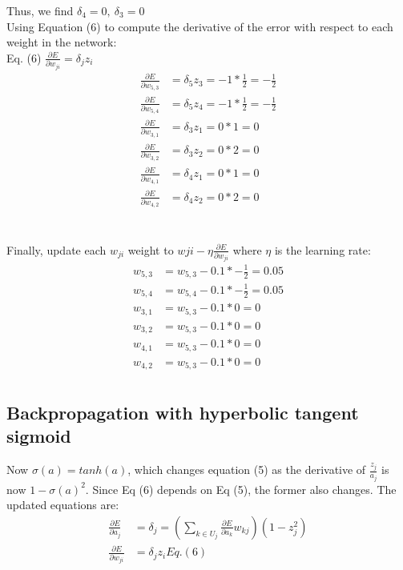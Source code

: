 \documentclass{article}
\begin{document}
Thus, we find $\delta_4 = 0,~\delta_3 = 0$
\\
Using Equation (6) to compute the derivative of the error with respect to each weight in the network: \\
Eq. (6) $\frac{\partial E}{\partial w_{ji}} = \delta_j z_i$
\begin{align*}
\frac{\partial E}{\partial w_{5,3}} &= \delta_5 z_3 = -1*\frac{1}{2} = -\frac{1}{2} \\
\frac{\partial E}{\partial w_{5,4}} &= \delta_5 z_4 = -1*\frac{1}{2} = -\frac{1}{2} \\
\frac{\partial E}{\partial w_{3,1}} &= \delta_3 z_1 = 0*1 = 0 \\
\frac{\partial E}{\partial w_{3,2}} &= \delta_3 z_2 = 0*2 = 0 \\
\frac{\partial E}{\partial w_{4,1}} &= \delta_4 z_1 = 0*1 = 0 \\
\frac{\partial E}{\partial w_{4,2}} &= \delta_4 z_2 = 0*2 = 0
\end{align*}
\\
\\
Finally, update each $w_{ji}$ weight to $w{ji} - \eta \frac{\partial E}{\partial w_{ji}}$ where $\eta$ is the learning rate:
\begin{align*}
 w_{5,3} &= w_{5,3} - 0.1*-\frac{1}{2} = 0.05\\
 w_{5,4} &= w_{5,4} - 0.1*-\frac{1}{2} = 0.05\\
 w_{3,1} &= w_{5,3} - 0.1*0 = 0\\
 w_{3,2} &= w_{5,3} - 0.1*0 = 0\\
 w_{4,1} &= w_{5,3} - 0.1*0 = 0\\
 w_{4,2} &= w_{5,3} - 0.1*0 = 0\\
\end{align*}


\subsection*{Backpropagation with hyperbolic tangent sigmoid}
Now $\sigma(a) = tanh(a)$, which changes equation (5) as the derivative of $\frac{z_j}{a_j}$ is now $1 - \sigma(a)^2$. Since Eq (6) depends on Eq (5), the former also changes. 
The updated equations are:
\begin{align*}
\frac{\partial E}{\partial a_j} &= \delta_j = \left( \sum_{k \in U_j} \frac{\partial E}{\partial a_k} w_{kj}  \right) \left( 1 - z_j^2 \right) \\
\frac{\partial E}{\partial w_{ji}} &= \delta_j z_i  Eq. (6)
\end{align*}
\end{document}
